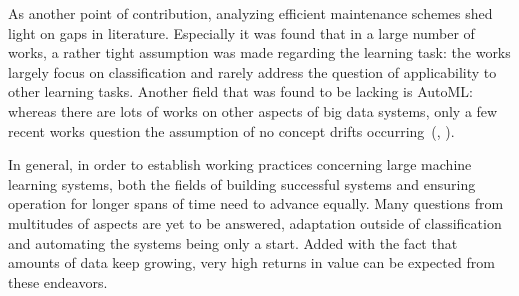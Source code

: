  \enlargethispage{7mm}
 As another point of contribution, analyzing efficient maintenance schemes shed light on gaps in literature. Especially it was found that in a large number of works, a rather tight assumption was made regarding the learning task: the works largely focus on classification and rarely address the question of applicability to other learning tasks. Another field that was found to be lacking is AutoML: whereas there are lots of works on other aspects of big data systems, only a few recent works question the assumption of no concept drifts occurring~(\cite{celikAdaptationStrategiesAutomated2021}, \cite{madridAutoMLPresenceDrift2019}).
 
 
 
 In general, in order to establish working practices concerning large machine learning systems, both the fields of building successful systems and ensuring operation for longer spans of time need to advance equally. Many questions from multitudes of aspects are yet to be answered, adaptation outside of classification and automating the systems being only a start. Added with the fact that amounts of data keep growing, very high returns in value can be expected from these endeavors.
